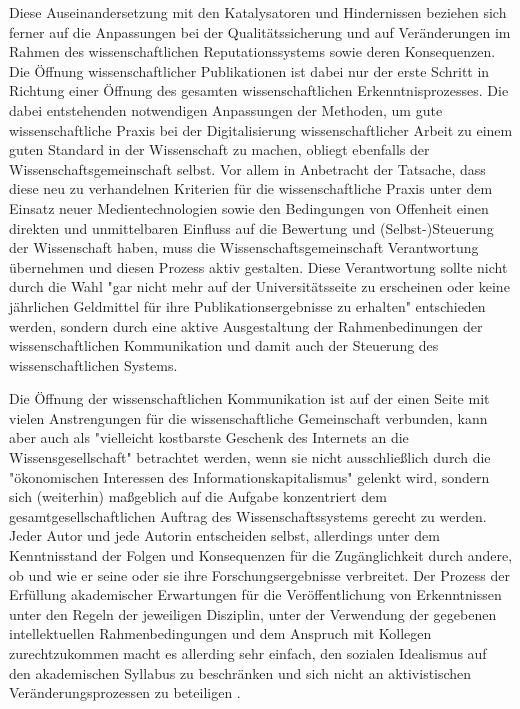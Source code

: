 Diese Auseinandersetzung mit den Katalysatoren und Hindernissen beziehen sich ferner auf die Anpassungen bei der Qualitätssicherung und auf Veränderungen im Rahmen des wissenschaftlichen Reputationssystems sowie deren Konsequenzen. Die Öffnung wissenschaftlicher Publikationen ist dabei nur der erste Schritt in Richtung einer Öffnung des gesamten wissenschaftlichen Erkenntnisprozesses. Die dabei entstehenden notwendigen Anpassungen der Methoden, um gute wissenschaftliche Praxis bei der Digitalisierung wissenschaftlicher Arbeit zu einem guten Standard in der Wissenschaft zu machen, obliegt ebenfalls der Wissenschaftsgemeinschaft selbst. Vor allem in Anbetracht der Tatsache, dass diese neu zu verhandelnen Kriterien für die wissenschaftliche Praxis unter dem Einsatz neuer Medientechnologien sowie den Bedingungen von Offenheit einen direkten und unmittelbaren Einfluss auf die Bewertung und (Selbst-)Steuerung der Wissenschaft haben, muss die Wissenschaftsgemeinschaft Verantwortung übernehmen und diesen Prozess aktiv gestalten. Diese Verantwortung sollte nicht durch die Wahl "gar nicht mehr auf der Universitätsseite zu erscheinen oder keine jährlichen Geldmittel für ihre Publikationsergebnisse zu erhalten" \cite{Warnke_2012} entschieden werden, sondern durch eine aktive Ausgestaltung der Rahmenbedinungen der wissenschaftlichen Kommunikation und damit auch der Steuerung des wissenschaftlichen Systems.

Die Öffnung der wissenschaftlichen Kommunikation ist auf der einen Seite mit vielen Anstrengungen für die wissenschaftliche Gemeinschaft verbunden, kann aber auch als "vielleicht kostbarste Geschenk des Internets an die Wissensgesellschaft" betrachtet werden, wenn sie nicht ausschließlich durch die "ökonomischen Interessen des Informationskapitalismus" \cite{hagner_2015_sache_buches} gelenkt wird, sondern sich (weiterhin) maßgeblich auf die Aufgabe konzentriert dem gesamtgesellschaftlichen Auftrag des Wissenschaftssystems gerecht zu werden. Jeder Autor und jede Autorin entscheiden selbst, allerdings unter dem Kenntnisstand der Folgen und Konsequenzen für die Zugänglichkeit durch andere, ob und wie er seine oder sie ihre Forschungsergebnisse verbreitet. Der Prozess der Erfüllung akademischer Erwartungen für die Veröffentlichung von Erkenntnissen unter den Regeln der jeweiligen Disziplin, unter der Verwendung der gegebenen intellektuellen Rahmenbedingungen und dem Anspruch  mit Kollegen zurechtzukommen macht es allerding sehr einfach, den sozialen Idealismus auf den akademischen Syllabus zu beschränken und sich nicht an aktivistischen Veränderungsprozessen zu beteiligen \cite[:25]{flood_2013_combining}.

